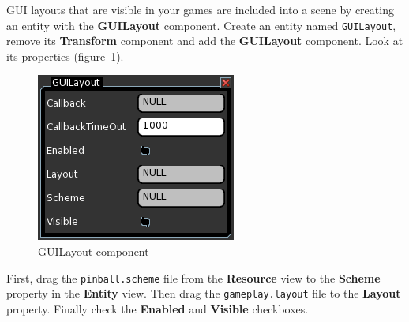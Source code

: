 \documentclass[a4paper,12pt]{article}
\begin{document}
GUI layouts that are visible in your games are included into a scene by creating an entity with the \textbf{GUILayout} component. Create an entity named \texttt{GUILayout}, remove its \textbf{Transform} component and add the \textbf{GUILayout} component. Look at its properties (figure~\ref{fig:guilayout_component}).

\begin{figure}[htb]
 \begin{center}
  \includegraphics[scale=0.65]{GUILayout}
 \end{center}
 \caption{GUILayout component}
 \label{fig:guilayout_component}
\end{figure}

First, drag the \texttt{pinball.scheme} file from the \textbf{Resource} view to the \textbf{Scheme} property in the \textbf{Entity} view. Then drag the \texttt{gameplay.layout} file to the \textbf{Layout} property. Finally check the \textbf{Enabled} and \textbf{Visible} checkboxes.
\end{document}
